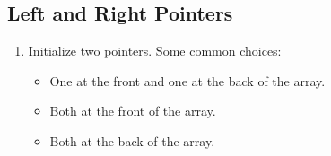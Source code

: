 \subsection{Left and Right Pointers}
\begin{algo}
    \begin{enumerate}
        \item Initialize two pointers. Some common choices:
        \begin{itemize}
            \item One at the front and one at the back of the array.
            \item Both at the front of the array.
            \item Both at the back of the array.
        \end{itemize}
    \end{enumerate}
\end{algo}
\newpage

